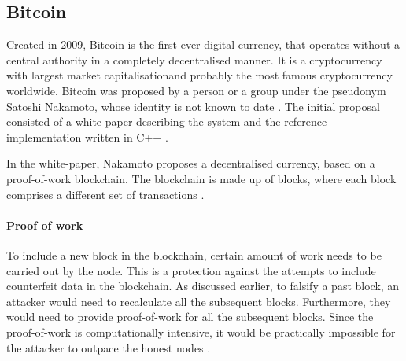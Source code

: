 \subsection{Bitcoin}
% 
Created in 2009, Bitcoin is the first ever digital currency, that operates without a central authority in a completely decentralised manner. It is a cryptocurrency with largest market capitalisation\footnotemark and probably the most famous cryptocurrency worldwide.
% 
% 
Bitcoin was proposed by a person or a group under the pseudonym Satoshi Nakamoto, whose identity is not known to date \cite{Feins2017SatoshiBitcoin}. The initial proposal consisted of a white-paper describing the system \cite{NakamotoBitcoin:System} and the reference implementation written in  C++ \footnotemark.
% 

In the white-paper, Nakamoto proposes a decentralised currency, based on a proof-of-work blockchain. The blockchain is made up of blocks, where each block comprises a different set of transactions \cite{Decker2013InformationNetwork, Judmayer2017BlocksMechanisms}.

\paragraph{Proof of work}
To include a new block in the blockchain, certain amount of work needs to be carried out by the node. This is a protection against the attempts to include counterfeit data in the blockchain. As discussed earlier, to falsify a past block, an attacker would need to recalculate all the subsequent blocks. Furthermore, they would need to provide proof-of-work for all the subsequent blocks. Since the proof-of-work is computationally intensive, it would be practically impossible for the attacker to outpace the honest nodes \cite{NakamotoBitcoin:System}.

